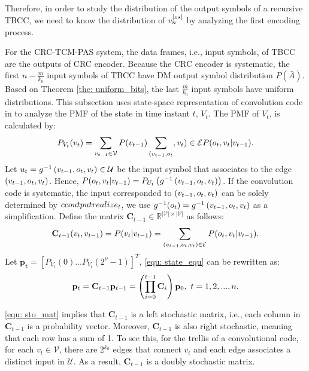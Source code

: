 \documentclass [PhD] {uclathes}
\begin{document}
Therefore, in order to study the distribution of the output symbols of a recursive TBCC, we need to know the distribution of ${{v}}_n^{[zs]}$ by analyzing the first encoding process. 

For the CRC-TCM-PAS system, the data frames, i.e., input symbols,  of TBCC are the outputs of CRC encoder. Because the CRC encoder is systematic, the first $n-\frac{m}{k_0}$ input symbols of TBCC have DM output symbol distribution $P(\bar{A})$. Based on Theorem \ref{the: uniform_bits}, the last $\frac{m}{k_0}$ input symbols have uniform distributions. This subsection uses state-space representation of convolution code in \cite{weiss2001code,fragouli1999convolutional} to analyze the PMF of the state in time instant $t$, $V_t$. The PMF of $V_t$, is calculated by:
\begin{align}
    P_{V_t}(v_t)
    =\sum_{v_{t-1}\in\mathcal{V}}P(v_{t-1})\sum_{(v_{t-1},o_t},v_t)\in\mathcal{E} P(o_t,v_{t}|v_{t-1}).\label{equ: state_equ}
\end{align}
Let $ {u}_t= g^{-1}\left(v_{t-1},o_t,v_t\right)\in \mathcal{U}$ be the input symbol that associates to the edge $(v_{t-1},o_t,v_t)$.
Hence, $P(o_t,v_t|v_{t-1})=P_{U_t}\left(g^{-1}\left(v_{t-1},o_t,v_t\right)\right)$. If the convolution code is systematic, the input corresponded to $(v_{t-1},o_t,v_t)$ can be solely determined by $\\ccoutputrealize_t$, we use $g^{-1}(o_t)=g^{-1}\left(v_{t-1},o_t,v_t\right)$ as a simplification.
Define the matrix $\mathbf{C}_{t-1}\in\mathbb{R}^{|\mathcal{V}|\times|\mathcal{V}|}$ as follows:
\begin{align}\label{equ: sto_mat}
    \mathbf{C}_{t-1}(v_{t},v_{t-1})=P(v_t|v_{t-1})=\sum_{(v_{t-1},o_t,v_t)\in\mathcal{E}} P(o_t,v_{t}|v_{t-1}).
\end{align}
Let $\mathbf{p_t}=\left[P_{V_t}(0)\dots P_{V_t}(2^{\nu}-1)\right]^T$, \eqref{equ: state_equ} can be rewritten as:
\begin{align}\label{equ: state_pmf}
    \mathbf{p}_t=\mathbf{C}_{t-1}\mathbf{p}_{t-1}= \left(\prod_{i=0}^{t-1} \mathbf{C}_{i}\right)\mathbf{p}_0, ~t=1,2,...,n.
\end{align}

\eqref{equ: sto_mat} implies that $\mathbf{C}_{t-1}$ is a left stochastic matrix, i.e., each column in $\mathbf{C}_{t-1}$ is a probability vector. Moreover, $\mathbf{C}_{t-1}$ is also right stochastic, meaning that each row has a sum of 1. To see this, for the trellis of a convolutional code, for each $v_{t}\in\mathcal{V}$, there are $2^{k_0}$ edges that connect $v_t$ and each edge associates a distinct input in $\mathcal{U}$. As a result, $\mathbf{C}_{t-1}$ is a doubly stochastic matrix.
\end{document}
